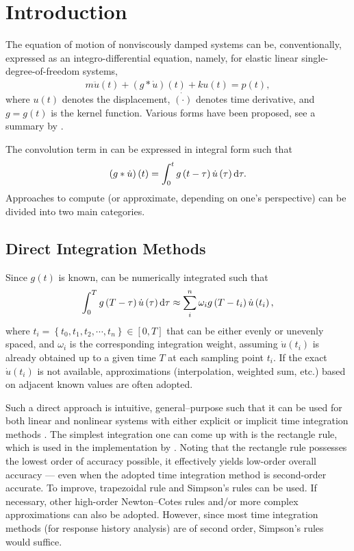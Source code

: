\section{Introduction}
The equation of motion of nonviscously damped systems can be, conventionally, expressed as an integro-differential equation, namely, for elastic linear single-degree-of-freedom systems,
\begin{gather}\label{eq:single_eom}
m\ddot{u}\left(t\right)+\left(g*\dot{u}\right)\left(t\right)+ku\left(t\right)=p\left(t\right),
\end{gather}
where $u(t)$ denotes the displacement, $\dot{(\cdot)}$ denotes time derivative, and $g=g(t)$ is the kernel function. Various forms have been proposed, see a summary by \citet[][Table 1.1]{Adhikari2014}.

The convolution term in  can be expressed in integral form such that
\begin{gather}\label{eq:conv}
\left(g*\dot{u}\right)\left(t\right)=\int_0^tg\left(t-\tau\right)\dot{u}\left(\tau\right)\mathrm{d}\tau.
\end{gather}
Approaches to compute (or approximate, depending on one's perspective)  can be divided into two main categories.
\subsection{Direct Integration Methods}
Since $g(t)$ is known,  can be numerically integrated such that
\begin{gather}
\int_0^Tg\left(T-\tau\right)\dot{u}\left(\tau\right)\mathrm{d}\tau\approx\sum_i^n\omega_ig\left(T-t_i\right)\dot{u}\left(t_i\right),
\end{gather}
where $t_i=\left\{t_0,t_1,t_2,\cdots,t_n\right\}\in[0,T]$ that can be either evenly or unevenly spaced, and $\omega_i$ is the corresponding integration weight, assuming $\dot{u}(t_i)$ is already obtained up to a given time $T$ at each sampling point $t_i$. If the exact $\dot{u}(t_i)$ is not available, approximations (interpolation, weighted sum, etc.) based on adjacent known values are often adopted.

Such a direct approach is intuitive, general--purpose such that it can be used for both linear and nonlinear systems with either explicit or implicit time integration methods \citep[see, e.g.,][]{Katsikadelis2019}. The simplest integration one can come up with is the rectangle rule, which is used in the implementation by \citet{Puthanpurayil2014}. Noting that the rectangle rule possesses the lowest order of accuracy possible, it effectively yields low-order overall accuracy --- even when the adopted time integration method is second-order accurate. To improve, trapezoidal rule \citep[see][]{Liu2014} and Simpson's rules \citep[see][]{Shen2019} can be used. If necessary, other high-order Newton--Cotes rules and/or more complex approximations \citep{Shen2021} can also be adopted. However, since most time integration methods (for response history analysis) are of second order, Simpson's rules would suffice.

